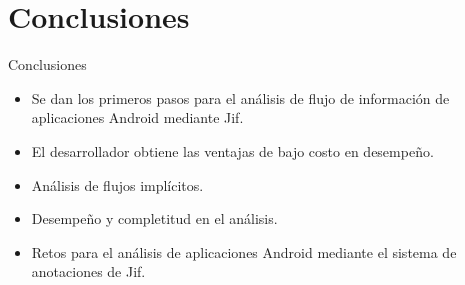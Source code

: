  \section{Conclusiones}
	
\begin{frame}{Conclusiones}
\begin{block}{}
	\begin{itemize}
		\item Se dan los primeros pasos para el análisis de flujo de
		información de aplicaciones Android mediante Jif.\pause
		\item El desarrollador obtiene las ventajas de bajo costo en desempeño.\pause
		\item Análisis de flujos implícitos.\pause
		\item Desempeño y completitud en el análisis.\pause
		\item Retos para el análisis de aplicaciones Android mediante el sistema de
		anotaciones de Jif.
	\end{itemize}
\end{block}
\end{frame}